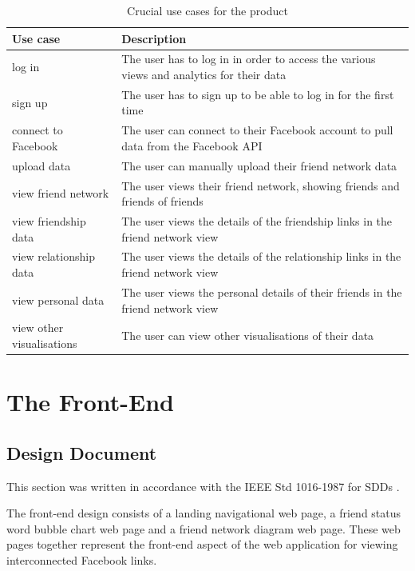 \documentclass[12pt,onecolumn]{article}
\begin{document}
	\begin{table} [htbp]
		\caption{Crucial use cases for the product}
		\label{usecase}
		\centering
		\begin{tabular}{p{}|p{}}
			\hline
			\textbf{Use case} & \textbf{Description} \\ \hline
			log in & The user has to log in in order to access the various views and analytics for their data \\
			sign up & The user has to sign up to be able to log in for the first time \\
			connect to Facebook & The user can connect to their Facebook account to pull data from the Facebook API \\
			upload data & The user can manually upload their friend network data \\
			view friend network & The user views their friend network, showing friends and friends of friends \\
			view friendship data & The user views the details of the friendship links in the friend network view \\
			view relationship data & The user views the details of the relationship links in the friend network view \\
			view personal data & The user views the personal details of their friends in the friend network view \\
			view other visualisations & The user can view other visualisations of their data \\ \hline
		\end{tabular}
	\end{table}
	
	
	
	\section{The Front-End}	
	
	\subsection{Design Document} %
	This section was written in accordance with the IEEE Std 1016-1987 for SDDs \cite{IEEE}. 
	
	The front-end design consists of a landing navigational web page, a friend status word bubble chart web page and a friend network diagram web page. These web pages together represent the front-end aspect of the web application for viewing interconnected Facebook links.
	
\end{document}
